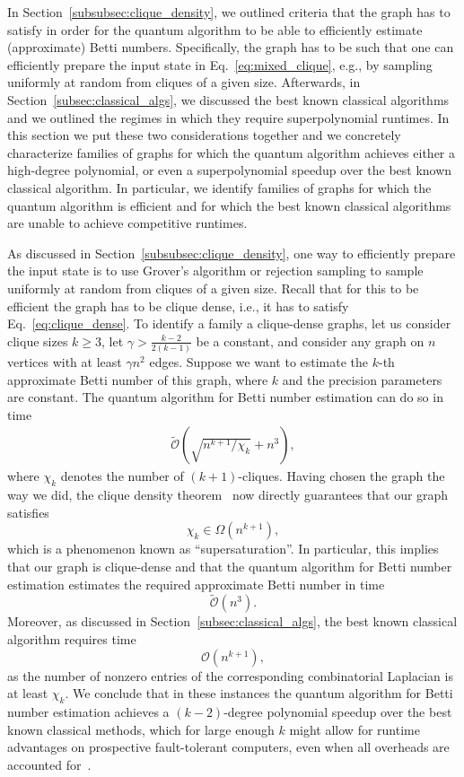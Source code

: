 \documentclass[a4paper, onecolumn, accepted=2022-08-28]{quantumarticle}
\newcommand{\bigO}[1]{\mathcal{O}\left( #1 \right)}
\newcommand{\bOt}[1]{\widetilde{\mathcal O}\left(#1\right)}
\begin{document}
In Section~\ref{subsubsec:clique_density}, we outlined criteria that the graph has to satisfy in order for the quantum algorithm to be able to efficiently estimate (approximate) Betti numbers.
Specifically, the graph has to be such that one can efficiently prepare the input state in Eq.~\eqref{eq:mixed_clique}, e.g., by sampling uniformly at random from cliques of a given size.
Afterwards, in Section~\ref{subsec:classical_algs}, we discussed the best known classical algorithms and we outlined the regimes in which they require superpolynomial runtimes. 
In this section we put these two considerations together and we concretely characterize families of graphs for which the quantum algorithm achieves either a high-degree polynomial, or even a superpolynomial speedup over the best known classical algorithm.
In particular, we identify families of graphs for which the quantum algorithm is efficient and for which the best known classical algorithms are unable to achieve competitive runtimes. 


As discussed in Section~\ref{subsubsec:clique_density}, one way to efficiently prepare the input state is to use Grover's algorithm or rejection sampling to sample uniformly at random from cliques of a given size.
Recall that for this to be efficient the graph has to be clique dense, i.e., it has to satisfy Eq.~\eqref{eq:clique_dense}.
To identify a family a clique-dense graphs, let us consider clique sizes $k \geq 3$, let $\gamma > \frac{k-2}{2(k-1)}$ be a constant, and consider any graph on $n$ vertices with at least $\gamma n^2$ edges.
Suppose we want to estimate the $k$-th approximate Betti number of this graph, where $k$ and the precision parameters are constant.
The quantum algorithm for Betti number estimation can do so in time
\begin{align*}
  \bOt{\sqrt{n^{k+1}/\chi_k} + n^3},
\end{align*}
where $\chi_k$ denotes the number of $(k+1)$-cliques. 
Having chosen the graph the way we did, the clique density theorem~\cite{reiher:clique} now directly guarantees that our graph satisfies 
\[
\chi_k \in \Omega(n^{k+1}),
\]
which is a phenomenon known as ``supersaturation''.
In particular, this implies that our graph is clique-dense and that the quantum algorithm for Betti number estimation estimates the required approximate Betti number in time
\[
\bOt{n^3}.
\]
Moreover, as discussed in Section~\ref{subsec:classical_algs}, the best known classical algorithm requires time
\[
    \bigO{n^{k+1}},
\]
as the number of nonzero entries of the corresponding combinatorial Laplacian is at least $\chi_k$.
We conclude that in these instances the quantum algorithm for Betti number estimation achieves a $(k-2)$-degree polynomial speedup over the best known classical methods, which for large enough $k$ might allow for runtime advantages on prospective fault-tolerant computers, even when all overheads are accounted for~\cite{babbush:poly_speedup}.
\end{document}
